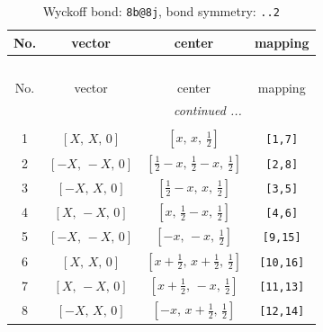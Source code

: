 \documentclass[fleqn,8pt]{jsarticle}
\begin{document}
\begin{longtable}{cccc}
\caption{Wyckoff bond: {\tt 8b@8j}, bond symmetry: {\tt ..2}}
 \\
 \hline \hline
No. & vector & center & mapping \\ \hline \endfirsthead

\multicolumn{3}{l}{\tablename\ \thetable{}} \\
 \hline \hline
No. & vector & center & mapping \\ \hline \endhead

 \hline \hline
\multicolumn{3}{r}{\footnotesize\it continued ...} \\ \endfoot

 \hline \hline
\multicolumn{3}{r}{} \\ \endlastfoot

1 & $\left[ X,\, X,\, 0 \right]$ & $\left[ x,\, x,\, \frac{1}{2} \right]$ & {\tt [1,7]} \\ \hline
2 & $\left[ - X,\, - X,\, 0 \right]$ & $\left[ \frac{1}{2} - x,\, \frac{1}{2} - x,\, \frac{1}{2} \right]$ & {\tt [2,8]} \\ \hline
3 & $\left[ - X,\, X,\, 0 \right]$ & $\left[ \frac{1}{2} - x,\, x,\, \frac{1}{2} \right]$ & {\tt [3,5]} \\ \hline
4 & $\left[ X,\, - X,\, 0 \right]$ & $\left[ x,\, \frac{1}{2} - x,\, \frac{1}{2} \right]$ & {\tt [4,6]} \\ \hline
5 & $\left[ - X,\, - X,\, 0 \right]$ & $\left[ - x,\, - x,\, \frac{1}{2} \right]$ & {\tt [9,15]} \\ \hline
6 & $\left[ X,\, X,\, 0 \right]$ & $\left[ x + \frac{1}{2},\, x + \frac{1}{2},\, \frac{1}{2} \right]$ & {\tt [10,16]} \\ \hline
7 & $\left[ X,\, - X,\, 0 \right]$ & $\left[ x + \frac{1}{2},\, - x,\, \frac{1}{2} \right]$ & {\tt [11,13]} \\ \hline
8 & $\left[ - X,\, X,\, 0 \right]$ & $\left[ - x,\, x + \frac{1}{2},\, \frac{1}{2} \right]$ & {\tt [12,14]} \\
\end{longtable}
\renewcommand{\arraystretch}{1.2}
\end{document}
